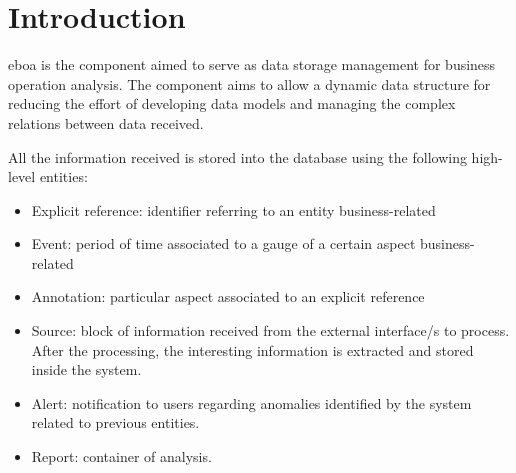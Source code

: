 \chapter{Introduction}\label{c:intro}

\acrshort{eboa} is the component aimed to serve as data storage management for business operation analysis. The component aims to allow a dynamic data structure for reducing the effort of developing data models and managing the complex relations between data received.

All the information received is stored into the database using the following high-level entities:

\begin{itemize}

\item Explicit reference: identifier referring to an entity business-related
\item Event: period of time associated to a gauge of a certain aspect business-related
\item Annotation: particular aspect associated to an explicit reference
\item Source: block of information received from the external interface/s to process. After the processing, the interesting information is extracted and stored inside the system.
\item Alert: notification to users regarding anomalies identified by the system related to previous entities.
\item Report: container of analysis.

\end{itemize}
